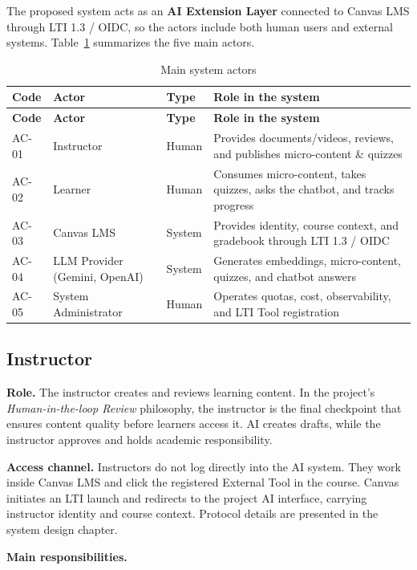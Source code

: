 The proposed system acts as an \textbf{AI Extension Layer} connected to Canvas
LMS through LTI 1.3 / OIDC, so the actors include both human users and external
systems. Table~\ref{tab:tac-nhan-he-thong} summarizes the five main actors.

\begin{longtable}{|p{1.5cm}|p{4cm}|p{2cm}|p{6cm}|}
\caption{Main system actors}
\label{tab:tac-nhan-he-thong}\\
\hline
\textbf{Code} & \textbf{Actor} & \textbf{Type} & \textbf{Role in the system} \\
\hline
\endfirsthead
\hline
\textbf{Code} & \textbf{Actor} & \textbf{Type} & \textbf{Role in the system} \\
\hline
\endhead
AC-01 & Instructor & Human & Provides documents/videos, reviews, and publishes micro-content \& quizzes \\
\hline
AC-02 & Learner & Human & Consumes micro-content, takes quizzes, asks the chatbot, and tracks progress \\
\hline
AC-03 & Canvas LMS & System & Provides identity, course context, and gradebook through LTI 1.3 / OIDC \\
\hline
AC-04 & LLM Provider (Gemini, OpenAI) & System & Generates embeddings, micro-content, quizzes, and chatbot answers \\
\hline
AC-05 & System Administrator & Human & Operates quotas, cost, observability, and LTI Tool registration \\
\hline
\end{longtable}

\subsection{Instructor}

\textbf{Role.} The instructor creates and reviews learning content. In the
project's \textit{Human-in-the-loop Review} philosophy, the instructor is the
final checkpoint that ensures content quality before learners access it. AI
creates drafts, while the instructor approves and holds academic responsibility.

\textbf{Access channel.} Instructors do not log directly into the AI system.
They work inside Canvas LMS and click the registered External Tool in the
course. Canvas initiates an LTI launch and redirects to the project AI
interface, carrying instructor identity and course context. Protocol details
are presented in the system design chapter.

\textbf{Main responsibilities.}

